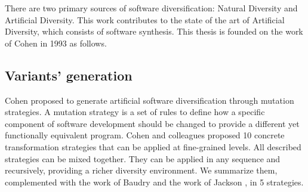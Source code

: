 





There are two primary sources of software diversification: Natural Diversity and Artificial Diversity\cite{natural_diversity}. This work contributes to the state of the art of Artificial Diversity, which consists of software synthesis. 
This thesis is founded on the work of Cohen in 1993 \cite{cohen1993operating} as follows.




\subsection{Variants' generation}
Cohen \etal \cite{cohen1993operating} proposed to generate artificial software diversification through mutation strategies.
A mutation strategy is a set of rules to define how a specific component of software development should be changed to provide a different yet functionally equivalent program. Cohen and colleagues proposed 10 concrete transformation strategies that can be applied at fine-grained levels. 
All described strategies can be mixed together. They can be applied in any sequence and recursively, providing a richer diversity environment. We summarize them, complemented with the work of Baudry \etal \cite{natural_diversity} and the work of Jackson \etal \cite{jackson}, in 5 strategies.



